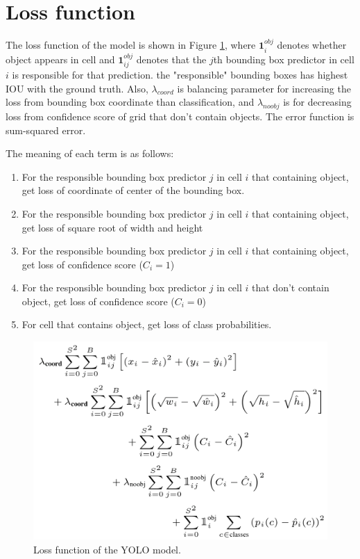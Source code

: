 \documentclass[extendedabs]{bmvc2k}
\begin{document}
\section{Loss function}
The loss function of the model is shown in Figure \ref{fig:loss}, where $\textbf{1}^{obj}_i$ denotes whether object appears in cell and $\textbf{1}^{obj}_{ij}$ denotes that the $j$th bounding box predictor in cell $i$ is responsible for that prediction. the "responsible" bounding boxes has highest IOU with the ground truth. Also, $\lambda_{coord}$ is balancing parameter for increasing the loss from bounding box coordinate than classification, and $\lambda_{noobj}$ is for decreasing loss from confidence score of grid that don't contain objects. The error function is sum-squared error.

The meaning of each term is as follows:

\begin{enumerate}
  \item For the responsible bounding box predictor $j$ in cell $i$ that containing object, get loss of coordinate of center of the bounding box.
  \item For the responsible bounding box predictor $j$ in cell $i$ that containing object, get loss of square root of width and height
  \item For the responsible bounding box predictor $j$ in cell $i$ that containing object, get loss of confidence score ($C_i=1$)
  \item For the responsible bounding box predictor $j$ in cell $i$ that don't contain object, get loss of confidence score ($C_i=0$)
  \item For cell that contains object, get loss of class probabilities.
\end{enumerate}

\begin{figure}[t]
	\includegraphics[width=\linewidth]{images/loss.png}
	\caption{
		Loss function of the YOLO model.}
	\vspace{-2mm}
        \label{fig:loss}
\end{figure}
\end{document}
